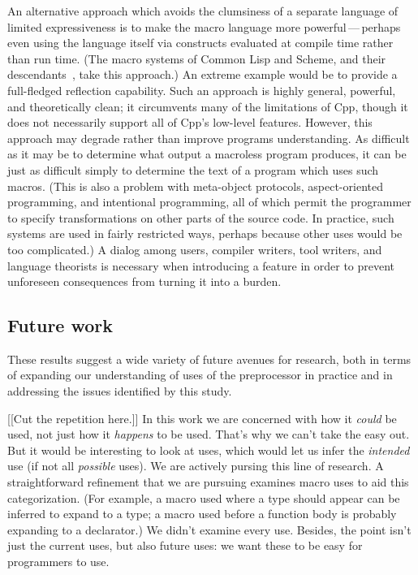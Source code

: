 \documentclass[10pt]{article}
\begin{document}
An alternative approach which avoids the clumsiness of a separate language
of limited expressiveness is to make the macro language more
powerful\,---\,perhaps even using the language itself via constructs
evaluated at compile time rather than run time.  (The macro systems of
Common Lisp and Scheme, and their descendants~\cite{WeiseC93}, take this
approach.)  An extreme example would be to provide a full-fledged
reflection capability.  Such an approach is highly general, powerful, and
theoretically clean; it circumvents many of the limitations of Cpp,
though it does not necessarily support all of Cpp's low-level features.
However, this approach may degrade rather than improve programs
understanding.  As difficult as it may be to determine what output a
macroless program produces, it can be just as difficult simply to determine
the text of a program which uses such macros.  (This is also a problem with
meta-object protocols, aspect-oriented programming, and intentional
programming, all of which permit the programmer to specify transformations
on other parts of the source code.  In practice, such systems are used in
fairly restricted ways, perhaps because other uses would be too
complicated.)  A dialog among users, compiler writers, tool writers, and
language theorists is necessary when introducing a feature in order to
prevent unforeseen consequences from turning it into a burden.


\subsection{Future work}
 
These results suggest a wide variety of future avenues for research, both
in terms of expanding our understanding of uses of the preprocessor in
practice and in addressing the issues identified by this study.

[[Cut the repetition here.]]
In this work  we are concerned with how it {\em could} be used, not just how it {\em
  happens} to be used.  That's why we can't take the easy out.  But it
  would be interesting to look at uses, which would let us infer the {\em
  intended} use (if not all {\em possible} uses).  We are actively pursing
  this line of research.
A straightforward refinement that we are pursuing examines macro uses to
aid this categorization.  (For example, a macro used where a type should
appear can be inferred to expand to a type; a macro used before a function
body is probably expanding to a declarator.)
        We didn't examine every use.  Besides, the point isn't just the
          current uses, but also future uses:  we want these to be easy for
          programmers to use.
\end{document}
